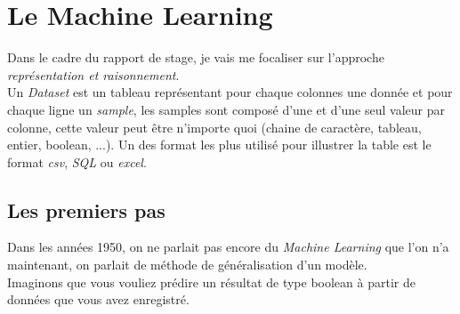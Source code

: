 \chapter{Le Machine Learning}

Dans le cadre du rapport de stage, je vais me focaliser sur l'approche \textit{représentation et raisonnement}.\\
\linebreak
Un \textit{Dataset} est un tableau représentant pour chaque colonnes une donnée et pour chaque ligne un \textit{sample}, les samples sont composé d'une et d'une seul valeur par colonne, cette valeur peut être n'importe quoi (chaine de caractère, tableau, entier, boolean, ...). Un des format les plus utilisé pour illustrer la table est le format \textit{csv}, \textit{SQL} ou \textit{excel}.\\
\pagebreak

\section{Les premiers pas}

Dans les années 1950, on ne parlait pas encore du \textit{Machine Learning} que l'on n'a maintenant, on parlait de méthode de généralisation d'un modèle.\\
Imaginons que vous vouliez prédire un résultat de type boolean à partir de données que vous avez enregistré.

